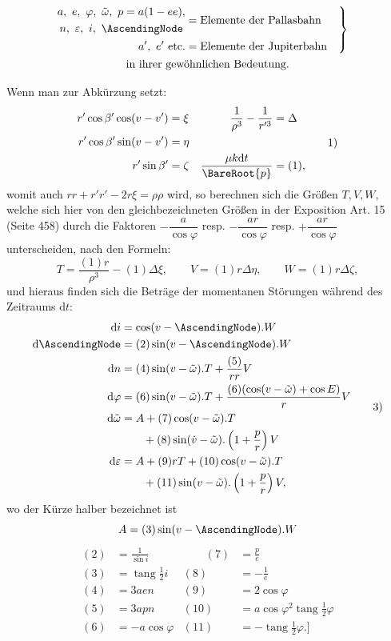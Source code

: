 \[
\begin{gathered}
\left.
\begin{aligned}
\begin{gathered}a,\ e,\ \varphi,\ \tilde\omega,\ p=a(1-ee),\\ n,\ \varepsilon,\ i,\ \AscendingNode\end{gathered}&=\text{Elemente der Pallasbahn}\\
a',\ e'\ \text{etc.}&=\text{Elemente der Jupiterbahn}
\end{aligned}
\right\}\quad\\
\text{in ihrer gewöhnlichen Bedeutung.}
\end{gathered}
\]
\par
Wenn man zur Abkürzung setzt:
\[
\begin{aligned}
r'\cos\beta'\cos(v-v')&=\xi&\qquad\frac{1}{\rho^{3}}-\frac{1}{r'^{3}}&=\Delta\\
r'\cos\beta'\sin(v-v')&=\eta&&\\
r'\sin\beta'&=\zeta&\frac{\mu k\mathrm{d}t}{\BareRoot{p}}&=(1),
\end{aligned}
\tag*{1)}
\]
womit auch \(rr+r'r'-2r\xi=\rho\rho\) wird, so berechnen sich die Größen \(T,V,W\), welche sich hier von den gleichbezeichneten Größen in der Exposition Art. 15 (Seite 458) durch die Faktoren \(-\dfrac{a}{\cos\varphi}\) resp. \(-\dfrac{ar}{\cos\varphi}\) resp. \(+\dfrac{ar}{\cos\varphi}\) unterscheiden, nach den Formeln:
\[
T=\frac{(1)r}{\rho^{3}}-(1)\Delta\xi,\qquad V=(1)r\Delta\eta,\qquad W=(1)r\Delta\zeta,
\tag*{2)}
\]
und hieraus finden sich die Beträge der momentanen Störungen während des Zeitraums \(\mathrm{d}t\):
\[
\begin{aligned}
\mathrm{d}i&=\cos(v-\AscendingNode).W\\
\mathrm{d}\AscendingNode&=(2)\sin(v-\AscendingNode).W\\
\mathrm{d}n&=(4)\sin(v-\tilde\omega).T+\frac{(5)}{rr}V\\
\mathrm{d}\varphi&=(6)\sin(v-\tilde\omega).T+\frac{(6)(\cos(v-\tilde\omega)+\cos E)}{r}V\\
\mathrm{d}\tilde\omega&=A+(7)\cos(v-\tilde\omega).T\\
&\qquad+(8)\sin(\dot v-\tilde\omega).\left(1+\frac{p}{r}\right)V\\
\mathrm{d}\varepsilon&=A+(9)rT+(10)\cos(v-\tilde\omega).T\\
&\qquad+(11)\sin(v-\tilde\omega).\left(1+\frac{p}{r}\right)V,
\end{aligned}
\tag*{3)}
\]
wo der Kürze halber bezeichnet ist
\[
A=(3)\sin(v-\AscendingNode).W
\]
\[
\begin{aligned}
(2)&=\frac{1}{\sin i}&\qquad(7)&=\frac{p}{e}\\[3pt]
(3)&=\operatorname{tang}\tfrac{1}{2}i&(8)&=-\frac{1}{e}\\[3pt]
(4)&=3aen&(9)&=2\cos\varphi\\[3pt]
(5)&=3apn&(10)&=a\cos\varphi^{2}\operatorname{tang}\tfrac{1}{2}\varphi\\[3pt]
(6)&=-a\cos\varphi&(11)&=-\operatorname{tang}\tfrac{1}{2}\varphi.]
\end{aligned}
\]
\par\endgroup
